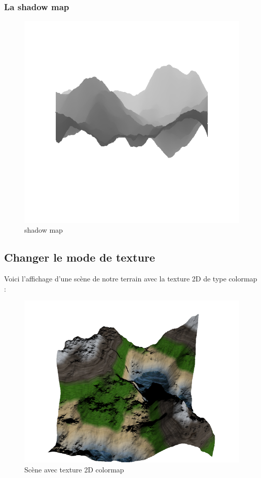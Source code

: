 \documentclass{article}
\begin{document}
\subsubsection{La shadow map}

\begin{figure}[h]
	\center
	\includegraphics[scale=0.40]{screen6.png}
	\caption{shadow map}
\end{figure}
\newpage
\subsection{Changer le mode de texture}

Voici l'affichage d'une scène de notre terrain avec la texture 2D de type colormap :

\begin{figure}[h]
	\center
	\includegraphics[scale=0.30]{screen9.png}
	\caption{Scène avec texture 2D colormap}
\end{figure}
\end{document}
